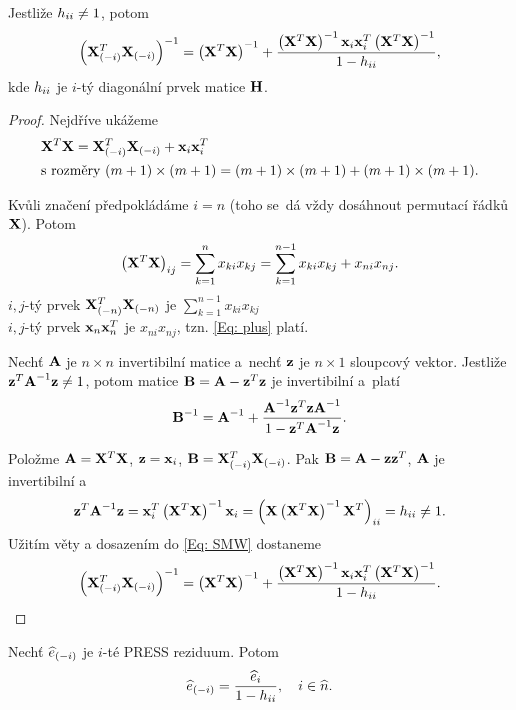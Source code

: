 \begin{theorem}
\label{Th: Rozklad_xtx}
Jestliže $h_{ii} \neq 1$, potom
 $$
\left(\mathbf{X}_{(-i)}^T \mathbf{X}_{(-i)} \right)^{-1} = \left(\mathbf{X}^T \mathbf{X} \right)^{-1} + \frac{\left(\mathbf{X}^T \mathbf{X} \right)^{-1} \mathbf{x}_i \mathbf{x}_i^T \left(\mathbf{X}^T \mathbf{X} \right)^{-1}}{1 - h_{ii}},
 $$
kde $h_{ii}$ je $i$-tý diagonální prvek matice $\textbf{H}$.
\end{theorem}

\begin{proof}
Nejdříve ukážeme
\begin{align}
	& \mathbf{X}^T \mathbf{X} = \mathbf{X}_{(-i)}^T \mathbf{X}_{(-i)} + \mathbf{x}_i \mathbf{x}_i^T \label{Eq: plus} \\
	& \text{s rozměry } (m+1) \times (m+1) = (m+1) \times (m+1) + (m+1) \times (m+1). \notag
\end{align}

\newcommand{\sumkn}{\sum_{k = 1}^n}
\newcommand{\sumknn}{\sum_{k = 1}^{n-1}}

Kvůli značení předpokládáme $i = n$ (toho se~dá vždy dosáhnout permutací řádků $\mathbf{X}$). Potom
 $$
\left(\X^T \X \right)_{ij} = \sumkn x_{ki} x_{kj} = \sumknn x_{ki} x_{kj} + x_{ni} x_{nj}.
 $$
 $i,j$-tý prvek $\mathbf{X}_{(-n)}^T \mathbf{X}_{(-n)}$ je $\sumknn x_{ki} x_{kj}$ \\
 $i,j$-tý prvek $\mathbf{x}_n \mathbf{x}_n^T$ je $x_{ni} x_{nj}$, tzn. \eqref{Eq: plus} platí.

\begin{theorem}
Nechť $\textbf{A}$ je $n \times n$ invertibilní matice a~nechť $\mathbf{z}$ je $n \times 1$ sloupcový vektor. Jestliže $\mathbf{z}^T {\textbf{A}^{-1}} \mathbf{z} \neq 1$, potom matice $\textbf{B} = \textbf{A} - \mathbf{z}^T \mathbf{z}$ je invertibilní a~platí
 \begin{equation}
{\textbf{B}^{-1}} = {\textbf{A}^{-1}} + \frac{{\textbf{A}^{-1}} \mathbf{z}^T \mathbf{z} {\textbf{A}^{-1}}}{1 - \mathbf{z}^T {\textbf{A}^{-1}} \mathbf{z}}.
\label{Eq: SMW}
\end{equation}
\end{theorem}

Položme $\textbf{A} = \mathbf{X}^T \mathbf{X}$, $\mathbf{z} = \mathbf{x}_i$, $\textbf{B} = \mathbf{X}_{(-i)}^T \mathbf{X}_{(-i)}$. Pak $\textbf{B} = \textbf{A} - \mathbf{z} \mathbf{z}^T$, $\textbf{A}$ je invertibilní a
 $$
\mathbf{z}^T {\textbf{A}^{-1}} \mathbf{z} = \mathbf{x}_i^T \left(\mathbf{X}^T \mathbf{X} \right)^{-1} \mathbf{x}_i = \left(\mathbf{X} \left(\mathbf{X}^T \mathbf{X} \right)^{-1} \mathbf{X}^T \right)_{ii} = h_{ii} \neq 1.
 $$
Užitím věty a dosazením do \eqref{Eq: SMW} dostaneme
 $$
\left(\mathbf{X}_{(-i)}^T \mathbf{X}_{(-i)} \right)^{-1} = \left(\mathbf{X}^T \mathbf{X} \right)^{-1} + \frac{\left(\mathbf{X}^T \mathbf{X} \right)^{-1} \mathbf{x}_i \mathbf{x}_i^T \left(\mathbf{X}^T \mathbf{X} \right)^{-1}}{1 - h_{ii}}.
 $$

\end{proof}

\begin{theorem}
\label{Th: ei}
	Nechť $\widehat{e}_{(-i)}$ je $i$-té PRESS reziduum. Potom
	 $$
	\widehat{e}_{(-i)} = \frac{\widehat{e}_i}{1 - h_{ii}}, \quad i\in\widehat{n}.
	 $$
\end{theorem}

